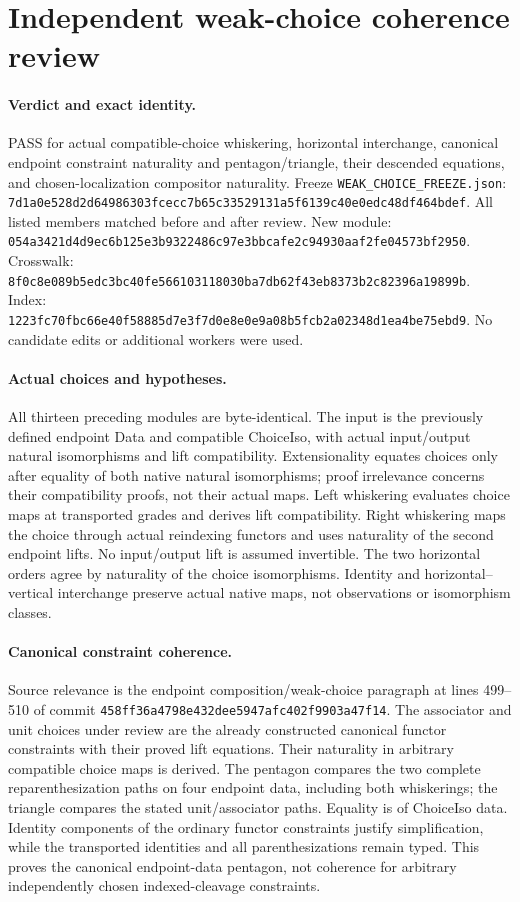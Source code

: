 \documentclass{article}
\begin{document}
\section*{Independent weak-choice coherence review}
\paragraph{Verdict and exact identity.} PASS for actual compatible-choice whiskering, horizontal interchange, canonical endpoint constraint naturality and pentagon/triangle, their descended equations, and chosen-localization compositor naturality. Freeze \texttt{WEAK\_CHOICE\_FREEZE.json}: \texttt{7d1a0e528d2d64986303fcecc7b65c33529131a5f6139c40e0edc48df464bdef}. All listed members matched before and after review. New module: \texttt{054a3421d4d9ec6b125e3b9322486c97e3bbcafe2c94930aaf2fe04573bf2950}. Crosswalk: \texttt{8f0c8e089b5edc3bc40fe566103118030ba7db62f43eb8373b2c82396a19899b}. Index: \texttt{1223fc70fbc66e40f58885d7e3f7d0e8e0e9a08b5fcb2a02348d1ea4be75ebd9}. No candidate edits or additional workers were used.
\paragraph{Actual choices and hypotheses.} All thirteen preceding modules are byte-identical. The input is the previously defined endpoint Data and compatible ChoiceIso, with actual input/output natural isomorphisms and lift compatibility. Extensionality equates choices only after equality of both native natural isomorphisms; proof irrelevance concerns their compatibility proofs, not their actual maps. Left whiskering evaluates choice maps at transported grades and derives lift compatibility. Right whiskering maps the choice through actual reindexing functors and uses naturality of the second endpoint lifts. No input/output lift is assumed invertible. The two horizontal orders agree by naturality of the choice isomorphisms. Identity and horizontal--vertical interchange preserve actual native maps, not observations or isomorphism classes.
\paragraph{Canonical constraint coherence.} Source relevance is the endpoint composition/weak-choice paragraph at lines 499--510 of commit \texttt{458ff36a4798e432dee5947afc402f9903a47f14}. The associator and unit choices under review are the already constructed canonical functor constraints with their proved lift equations. Their naturality in arbitrary compatible choice maps is derived. The pentagon compares the two complete reparenthesization paths on four endpoint data, including both whiskerings; the triangle compares the stated unit/associator paths. Equality is of ChoiceIso data. Identity components of the ordinary functor constraints justify simplification, while the transported identities and all parenthesizations remain typed. This proves the canonical endpoint-data pentagon, not coherence for arbitrary independently chosen indexed-cleavage constraints.
\end{document}
